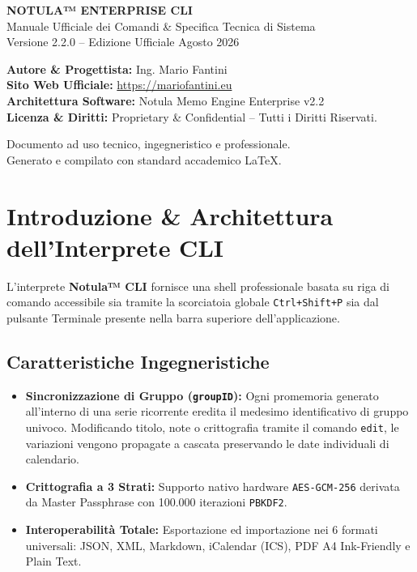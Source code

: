\documentclass[11pt,a4paper]{article}
\begin{document}
\begin{titlepage}
    \centering
    \vspace*{1.5cm}
    {\huge\bfseries NOTULA™ ENTERPRISE CLI}\\[0.4cm]
    {\Large Manuale Ufficiale dei Comandi \& Specifica Tecnica di Sistema}\\[0.2cm]
    {\large Versione 2.2.0 -- Edizione Ufficiale Agosto 2026}\\[2cm]
    
    \begin{tcolorbox}[colback=blue!5!white,colframe=blue!75!black,title=\textbf{Informazioni sull'Opera \& Proprietà Intellettuale}]
        \textbf{Autore \& Progettista:} Ing. Mario Fantini\\
        \textbf{Sito Web Ufficiale:} \href{https://mariofantini.eu}{https://mariofantini.eu}\\
        \textbf{Architettura Software:} Notula Memo Engine Enterprise v2.2\\
        \textbf{Licenza \& Diritti:} Proprietary \& Confidential -- Tutti i Diritti Riservati.
    \end{tcolorbox}
    
    \vfill
    {\small Documento ad uso tecnico, ingegneristico e professionale.\\
    Generato e compilato con standard accademico \LaTeX.}
\end{titlepage}

\tableofcontents
\newpage

\section{Introduzione \& Architettura dell'Interprete CLI}
L'interprete \textbf{Notula™ CLI} fornisce una shell professionale basata su riga di comando accessibile sia tramite la scorciatoia globale \texttt{Ctrl+Shift+P} sia dal pulsante Terminale presente nella barra superiore dell'applicazione.

\subsection{Caratteristiche Ingegneristiche}
\begin{itemize}
    \item \textbf{Sincronizzazione di Gruppo (\texttt{groupID}):} Ogni promemoria generato all'interno di una serie ricorrente eredita il medesimo identificativo di gruppo univoco. Modificando titolo, note o crittografia tramite il comando \texttt{edit}, le variazioni vengono propagate a cascata preservando le date individuali di calendario.
    \item \textbf{Crittografia a 3 Strati:} Supporto nativo hardware \texttt{AES-GCM-256} derivata da Master Passphrase con 100.000 iterazioni \texttt{PBKDF2}.
    \item \textbf{Interoperabilità Totale:} Esportazione ed importazione nei 6 formati universali: JSON, XML, Markdown, iCalendar (ICS), PDF A4 Ink-Friendly e Plain Text.
\end{itemize}
\end{document}
